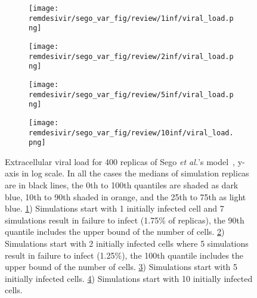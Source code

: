 \begin{figure}[H]

  \begin{subfigure}[b]{0.48\linewidth}
    \centering
    \texttt{[image: remdesivir/sego\_var\_fig/review/1inf/viral\_load.png]} 
    \caption{} 
    \label{fig:res:var_sego:load:1inf} 
  \end{subfigure} 
  \hspace{\fill}  %
  \begin{subfigure}[b]{0.48\linewidth}
    \centering
    \texttt{[image: remdesivir/sego\_var\_fig/review/2inf/viral\_load.png]} 
    \caption{} 
    \label{fig:res:var_sego:load:2inf} 
  \end{subfigure} 

    \vspace{4ex}
  \begin{subfigure}[b]{0.48\linewidth}
    \centering
    \texttt{[image: remdesivir/sego\_var\_fig/review/5inf/viral\_load.png]} 
    \caption{} 
    \label{fig:res:var_sego:load:5inf:app} 
  \end{subfigure} 
  \hspace{\fill}
   \begin{subfigure}[b]{0.48\linewidth}
    \centering
    \texttt{[image: remdesivir/sego\_var\_fig/review/10inf/viral\_load.png]} 
    \caption{} 
    \label{fig:res:var_sego:load:10inf} 
  \end{subfigure} 
\caption{Extracellular viral load for 400 replicas of Sego \emph{et al.}'s model~\cite{sego_modular_2020}, y-axis in log scale. In all the cases the medians of simulation replicas are in black lines, the 0th to 100th quantiles are shaded as dark blue, 10th to 90th shaded in orange, and the 25th to 75th as light blue. \ref{fig:res:var_sego:load:1inf}) Simulations start with 1 initially infected cell and 7 simulations result in failure to infect (1.75\% of replicas), the 90th quantile includes the upper bound of the number of cells. \ref{fig:res:var_sego:load:2inf}) Simulations start with 2 initially infected cells where 5 simulations result in failure to infect (1.25\%), the 100th quantile includes the upper bound of the number of cells. \ref{fig:res:var_sego:load:5inf:app}) Simulations start with 5 initially infected cells. \ref{fig:res:var_sego:load:10inf}) Simulations start with 10 initially infected cells.}\label{fig:res:var_sego:load} 
\end{figure}

